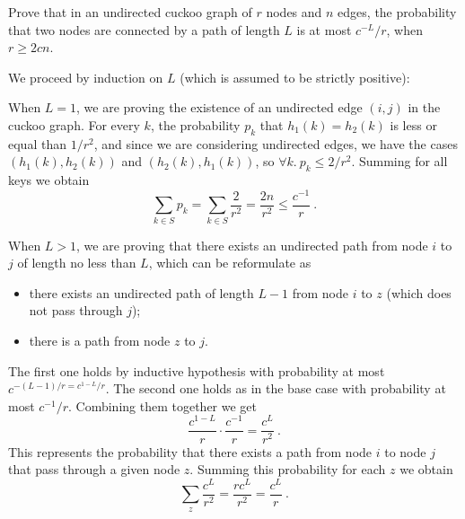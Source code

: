 \exercise

Prove that in an undirected cuckoo graph of $r$ nodes and $n$ edges, the
probability that two nodes are connected by a path of length $L$ is at most
$c^{-L}/r$, when $r \ge 2cn$.

\solution

We proceed by induction on $L$ (which is assumed to be strictly positive):
%
\begin{description}[labelindent=0.5cm, leftmargin=1cm]

  \item[\bf Base case.] When $L = 1$, we are proving the existence of an
  undirected edge $(i, j)$ in the cuckoo graph. For every $k$, the probability
  $p_k$ that $h_1(k) = h_2(k)$ is less or equal than $1/r^2$, and since we are
  considering undirected edges, we have the cases $(h_1(k), h_2(k))$ and
  $(h_2(k), h_1(k))$, so $\forall k.\ p_k \le 2/r^2$. Summing for all keys we
  obtain $$\sum_{k \in S} p_k = \sum_{k \in S} \frac{2}{r^2} = \frac{2n}{r^2}
  \le  \frac{c^{-1}}{r}\ .$$

  \item[\bf Inductive case.] When $L > 1$, we are proving that there exists an
  undirected path from node $i$ to $j$ of length no less than $L$, which can be
  reformulate as
  \begin{itemize}

    \item there exists an undirected path of length $L - 1$ from node $i$ to $z$
    (which does not pass through $j$);

    \item there is a path from node $z$ to $j$.

  \end{itemize}
  The first one holds by inductive hypothesis with probability at most $c^{-(L -
  1)/r = c^{1 - L}/r}$. The second one holds as in the base case with
  probability at most $c^{-1}/r$. Combining them together we get $$\frac{c^{1 -
  L}}{r}\cdot\frac{c^{-1}}{r} = \frac{c^L}{r^2}\ .$$ This represents the
  probability that there exists a path from node $i$ to node $j$ that pass
  through a given node $z$. Summing this probability for each $z$ we obtain
  $$\sum_z \frac{c^L}{r^2} = \frac{rc^L}{r^2} = \frac{c^L}{r}\ .$$

\end{description}
